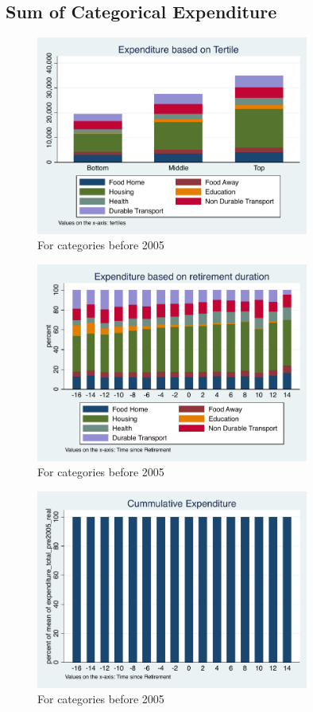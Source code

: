 \documentclass[11pt,onecolumn]{article}
\numberwithin{figure}{section}
\begin{document}
\subsection{Sum of Categorical Expenditure}

\begin{figure}[h]
	\caption{For categories before 2005}
	\centering
	\includegraphics[width=0.8\textwidth]{../ConsumptionPostRetirement/Tertile_Bar/cummulative_tertile.pdf}
\end{figure}

\begin{figure}[h]
	\caption{For categories before 2005}
	\centering
	\includegraphics[width=0.8\textwidth]{../ConsumptionPostRetirement/Tertile_Bar/across_ret_duration.pdf}
\end{figure}


\begin{figure}[h]
	\caption{For categories before 2005}
	\centering
	\includegraphics[width=0.8\textwidth]{../ConsumptionPostRetirement/Tertile_Bar/cummulative_exp.pdf}
\end{figure}
\end{document}
